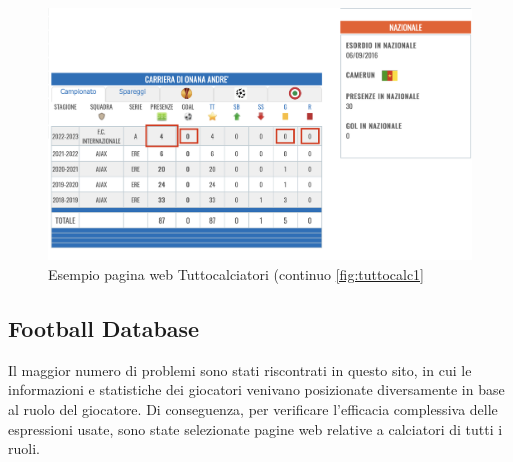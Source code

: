\begin{figure}
    \centering
    \includegraphics[scale=0.4]{img/tuttocalc2.png}
    \caption{Esempio pagina web Tuttocalciatori (continuo \ref{fig:tuttocalc1}}
    \label{fig:tuttocalc2}
\end{figure}

\subsection{Football Database}\label{se:fdb}
Il maggior numero di problemi sono stati riscontrati in questo sito, in cui le informazioni e statistiche dei giocatori venivano posizionate diversamente in base al ruolo del giocatore. Di conseguenza, per verificare l'efficacia complessiva delle espressioni usate, sono state selezionate pagine web relative a calciatori di tutti i ruoli. 

